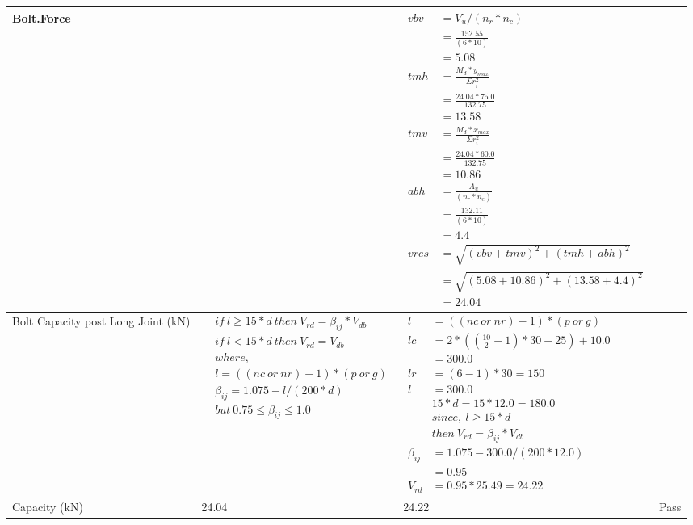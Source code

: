 \documentclass{article}%
\begin{document}
\begin{longtable}{|p{4cm}|p{5cm}|p{5.5cm}|p{1.5cm}|}
\hline%
Bolt.Force&&$\begin{aligned} vbv~~ &= V_u / (n_r * n_c)\\  &= \frac{152.55}{ (6*10)}\\  & =5.08\\ tmh~ &= \frac{M_d * y_{max} }{ \Sigma r_i^2} \\  &= \frac{24.04 *75.0}{132.75}\\  & =13.58\\  tmv ~&= \frac{M_d * x_{max}}{\Sigma r_i^2}\\ &= \frac{24.04 * 60.0}{132.75}\\  & =10.86\\  abh~ & = \frac{A_u }{(n_r * n_c)}\\   & =\frac{132.11}{ (6 *10)}\\  & =4.4\\  vres &=\sqrt{(vbv +tmv) ^ 2 + (tmh+abh) ^ 2}\\   &= \sqrt{(5.08 +10.86) ^2 + (13.58+4.4) ^ 2}\\  & =24.04\end{aligned}$&\\%
\hline%
Bolt Capacity post Long Joint (kN)&$\begin{aligned} &if~l\geq 15 * d~then~V_{rd} = \beta_{ij} * V_{db} \\ & if~l < 15 * d~then~V_{rd} = V_{db} \\ & where,\\ & l = ((nc~or~nr) - 1) * (p~or~g) \\ & \beta_{ij} = 1.075 - l/(200 * d) \\ & but~0.75\leq\beta_{ij}\leq1.0 \end{aligned}$&$\begin{aligned} l&= ((nc~or~nr) - 1) * (p~or~g) \\  lc&= 2*((\frac{10}{2} - 1) * 30+25)+ 10.0\\&=300.0\\  lr&= (6 - 1) * 30=150\\  l&= 300.0\\ & 15 * d = 15 * 12.0 = 180.0 \\ &since,~l \geq 15 * d~ \\&then~V_{rd} = \beta_{ij} * V_{db} \\ \beta_{ij} &= 1.075 - 300.0/(200*12.0) \\&=0.95\\ V_{rd} &= 0.95 * 25.49=24.22 \end{aligned}$&\\%
\hline%
Capacity (kN)&24.04&24.22&Pass\\%
\hline%
\end{longtable}
\end{document}
